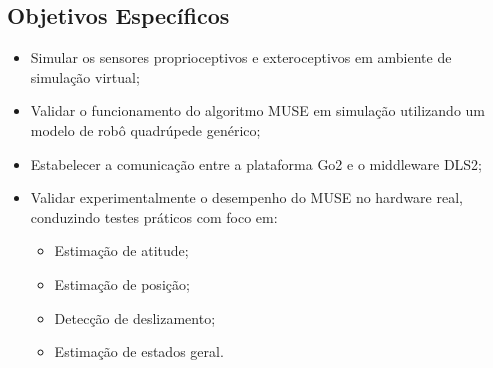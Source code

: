 \subsection{Objetivos Específicos}
\begin{itemize}
    \item Simular os sensores proprioceptivos e exteroceptivos em ambiente de simulação virtual;
    \item Validar o funcionamento do algoritmo MUSE em simulação utilizando um modelo de robô quadrúpede genérico;
    \item Estabelecer a comunicação entre a plataforma Go2 e o middleware DLS2;
    \item Validar experimentalmente o desempenho do MUSE no hardware real, conduzindo testes práticos com foco em:
    \begin{itemize}
        \item Estimação de atitude;
        \item Estimação de posição;
        \item Detecção de deslizamento;
        \item Estimação de estados geral.
    \end{itemize}
\end{itemize}

